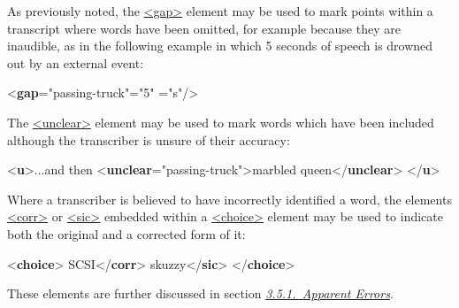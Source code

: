 As previously noted, the \hyperref[TEI.gap]{<gap>} element may be used to mark points within a transcript where words have been omitted, for example because they are inaudible, as in the following example in which 5 seconds of speech is drowned out by an external event: \par\bgroup{}\exampleFont \begin{shaded}\noindent\mbox{}{<\textbf{gap}\hspace*{1em}{reason}="{passing-truck}"\hspace*{1em}{quantity}="{5}"\mbox{}\newline 
\hspace*{1em}{unit}="{s}"/>}\end{shaded}\egroup\par \par
The \hyperref[TEI.unclear]{<unclear>} element may be used to mark words which have been included although the transcriber is unsure of their accuracy: \par\bgroup{}\exampleFont \begin{shaded}\noindent\mbox{}{<\textbf{u}>}...and then {<\textbf{unclear}\hspace*{1em}{reason}="{passing-truck}">}marbled queen{</\textbf{unclear}>}\mbox{}\newline 
{</\textbf{u}>}\end{shaded}\egroup\par \par
Where a transcriber is believed to have incorrectly identified a word, the elements \hyperref[TEI.corr]{<corr>} or \hyperref[TEI.sic]{<sic>} embedded within a \hyperref[TEI.choice]{<choice>} element may be used to indicate both the original and a corrected form of it: \par\bgroup{}\exampleFont \begin{shaded}\noindent\mbox{}{<\textbf{choice}>}\mbox{}\newline 
{}SCSI{</\textbf{corr}>}\mbox{}\newline 
{}skuzzy{</\textbf{sic}>}\mbox{}\newline 
{</\textbf{choice}>}\end{shaded}\egroup\par \noindent  These elements are further discussed in section \textit{\hyperref[COEDCOR]{3.5.1.\ Apparent Errors}}.\par
